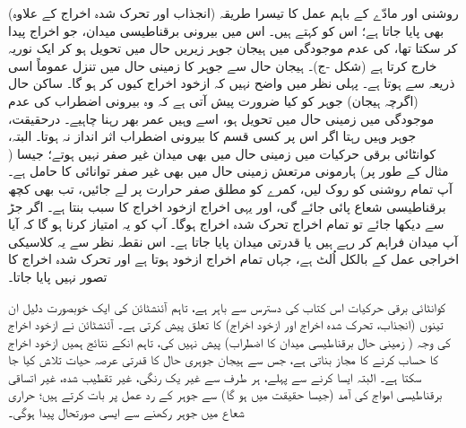 (انجذاب اور تحرک شدہ اخراج کے علاوہ) روشنی اور مادّے کے باہم عمل کا تیسرا طریقہ بھی پایا جاتا ہے؛ اس کو  کہتے ہیں۔ اس میں بیرونی برقناطیسی میدان، جو اخراج پیدا کر سکتا تھا، کی عدم موجودگی میں ہیجان جوہر زیریں حال میں تحویل ہو کر ایک نوریہ خارج کرتا ہے (شکل -ج)۔ 	ہیجان حال سے جوہر کا زمینی حال میں تنزل عموماً اسی ذریعہ سے ہوتا ہے۔ پہلی نظر میں واضح نہیں کہ ازخود اخراج کیوں کر ہو گا۔ ساکن حال (اگرچہ ہیجان) جوہر کو کیا ضرورت پیش آتی ہے کہ وہ بیرونی اضطراب کی عدم موجودگی میں زمینی حال میں تحویل ہو، اسے وہیں عمر بھر رہنا چاہیے۔ درحقیقت، جوہر وہیں رہتا اگر اس پر کسی قسم کا بیرونی اضطراب اثر انداز نہ ہوتا۔ البتہ، کوانٹائی برقی حرکیات میں زمینی حال میں بھی میدان غیر صفر نہیں ہوتے؛ جیسا ( مثال کے طور پر) ہارمونی مرتعش زمینی حال میں بھی غیر صفر توانائی  کا حامل ہے۔ آپ تمام روشنی کو روک لیں، کمرے کو مطلق صفر حرارت پر لے جائیں، تب بھی کچھ برقناطیسی شعاع پائی جائے گی، اور یہی  اخراج ازخود اخراج کا سبب بنتا ہے۔ اگر جڑ سے دیکھا جائے تو تمام اخراج تحرک شدہ اخراج ہوگا۔ آپ کو یہ امتیاز کرنا ہو گا کہ آیا آپ میدان فراہم کر رہے ہیں یا قدرتی میدان پایا جاتا ہے۔ اس نقطہ نظر سے یہ کلاسیکی اخراجی عمل کے بالکل اُلٹ ہے، جہاں تمام اخراج ازخود ہوتا ہے اور تحرک شدہ اخراج کا تصور نہیں پایا جاتا۔

کوانٹائی برقی حرکیات اس کتاب کی دسترس سے باہر ہے، تاہم آئنشٹائن کی ایک خوبصورت دلیل ان تینوں (انجذاب، تحرک شدہ اخراج اور ازخود اخراج) کا تعلق پیش کرتی ہے۔ آئنشٹائن نے ازخود اخراج کی وجہ ( زمینی حال برقناطیسی میدان کا اضطراب) پیش نہیں کی، تاہم انکے نتائج ہمیں ازخود اخراج کا حساب کرنے کا مجاز بناتی ہے، جس سے ہیجان جوہری حال کا قدرتی عرصہ حیات تلاش کیا جا سکتا ہے۔ البتہ ایسا کرنے سے پہلے، ہر طرف سے غیر یک رنگی، غیر تقطیب شدہ، غیر اتساقی برقناطیسی امواج کی آمد (جیسا حقیقت میں ہو گا) سے جوہر کے رد عمل پر بات کرتے ہیں؛ حراری شعاع میں جوہر رکھنے سے ایسی صورتحال پیدا ہوگی۔

